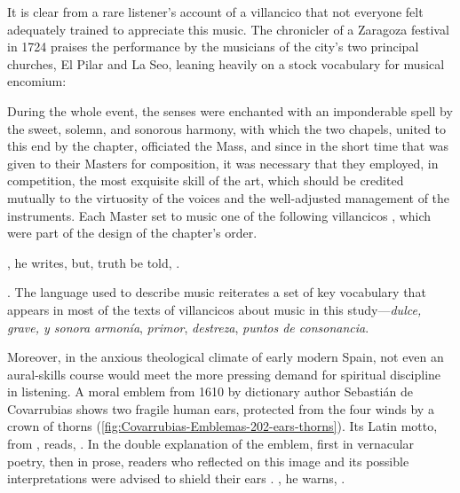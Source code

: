 It is clear from a rare listener's account of a villancico that not everyone
felt adequately trained to appreciate this music.
The chronicler of a Zaragoza festival in 1724 praises the performance by the
musicians of the city's two principal churches, El Pilar and La Seo, leaning
heavily on a stock vocabulary for musical encomium: 
\begin{quoting}
    During the whole event, the senses were enchanted with an imponderable spell
    by the sweet, solemn, and sonorous harmony, with which the two chapels,
    united to this end by the chapter, officiated the Mass, and since in the
    short time that was given to their Masters for composition, it was necessary
    that they employed, in competition, the most exquisite skill
     of the art, which should be credited mutually to the
    virtuosity  of the voices and the well-adjusted management
    of the instruments.  Each Master set to music one of the following
    villancicos , which were part of the design
    of the chapter's order.
\end{quoting}
, he
writes, but, truth be told, .%
\begin{Footnote}
    \Autocite[97]{Zaragoza1724Relacion}.
    The language used to describe music reiterates a set of key vocabulary that
    appears in most of the texts of villancicos about music in this
    study---\emph{dulce, grave, y sonora armonía}, \emph{primor},
    \emph{destreza}, \emph{puntos de consonancia}.
\end{Footnote}
Moreover, in the anxious theological climate of early modern Spain, not even an
aural-skills course would meet the more pressing demand for spiritual discipline
in listening.
A moral emblem from 1610 by dictionary author Sebastián de Covarrubias shows two
fragile human ears, protected from the four winds by a crown of thorns
(\cref{fig:Covarrubias-Emblemas-202-ears-thorns}).
Its Latin motto, from , reads, .%
    \Autocite[202]{Covarrubias:Emblemas}
In the double explanation of the emblem, first in vernacular poetry, then in
prose, readers who reflected on this image and its possible interpretations were
advised to shield their ears .%
    \Autocite[203]{Covarrubias:Emblemas}
, he warns, .%
    \Autocite[202]{Covarrubias:Emblemas}

